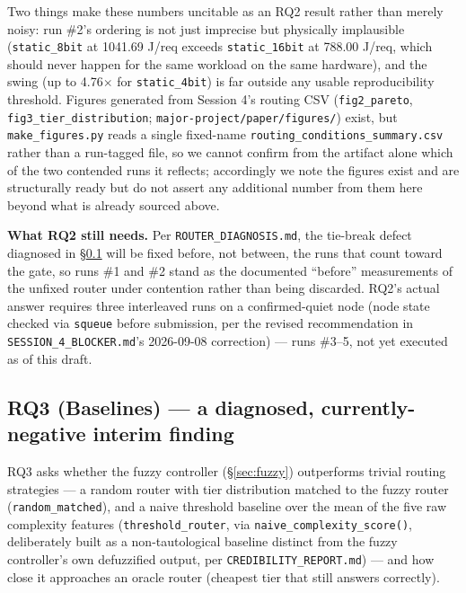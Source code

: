 \documentclass[conference]{IEEEtran}
\begin{document}
Two things make these numbers uncitable as an RQ2 result rather than
merely noisy: run \#2's ordering is not just imprecise but physically
implausible (\texttt{static\_8bit} at 1041.69 J/req exceeds
\texttt{static\_16bit} at 788.00 J/req, which should never happen for the
same workload on the same hardware), and the swing (up to 4.76$\times$
for \texttt{static\_4bit}) is far outside any usable reproducibility
threshold. Figures generated from Session 4's routing CSV
(\texttt{fig2\_pareto}, \texttt{fig3\_tier\_distribution};
\texttt{major-project/paper/figures/}) exist, but \texttt{make\_figures.py}
reads a single fixed-name \texttt{routing\_conditions\_summary.csv} rather
than a run-tagged file, so we cannot confirm from the artifact alone
which of the two contended runs it reflects; accordingly we note the
figures exist and are structurally ready but do not assert any additional
number from them here beyond what is already sourced above.

\textbf{What RQ2 still needs.} Per \texttt{ROUTER\_DIAGNOSIS.md}, the
tie-break defect diagnosed in \S\ref{sec:rq3} will be fixed before, not
between, the runs that count toward the gate, so runs \#1 and \#2 stand
as the documented ``before'' measurements of the unfixed router under
contention rather than being discarded. RQ2's actual answer requires
three interleaved runs on a confirmed-quiet node (node state checked via
\texttt{squeue} before submission, per the revised recommendation in
\texttt{SESSION\_4\_BLOCKER.md}'s 2026-09-08 correction) --- runs \#3--5,
not yet executed as of this draft.

\subsection{RQ3 (Baselines) --- a diagnosed, currently-negative interim finding}
\label{sec:rq3}

RQ3 asks whether the fuzzy controller (\S\ref{sec:fuzzy}) outperforms
trivial routing strategies --- a random router with tier distribution
matched to the fuzzy router (\texttt{random\_matched}), and a naive
threshold baseline over the mean of the five raw complexity features
(\texttt{threshold\_router}, via \texttt{naive\_complexity\_score()},
deliberately built as a non-tautological baseline distinct from the fuzzy
controller's own defuzzified output, per \texttt{CREDIBILITY\_REPORT.md})
--- and how close it approaches an oracle router (cheapest tier that
still answers correctly).
\end{document}
